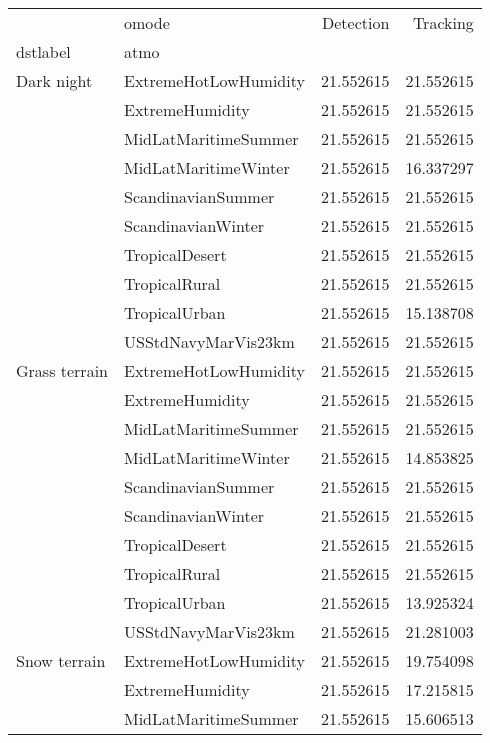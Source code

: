 \begin{tabular}{llrr}
\toprule
             & omode &  Detection &   Tracking \\
dstlabel & atmo &            &            \\
\midrule
Dark night & ExtremeHotLowHumidity &  21.552615 &  21.552615 \\
             & ExtremeHumidity &  21.552615 &  21.552615 \\
             & MidLatMaritimeSummer &  21.552615 &  21.552615 \\
             & MidLatMaritimeWinter &  21.552615 &  16.337297 \\
             & ScandinavianSummer &  21.552615 &  21.552615 \\
             & ScandinavianWinter &  21.552615 &  21.552615 \\
             & TropicalDesert &  21.552615 &  21.552615 \\
             & TropicalRural &  21.552615 &  21.552615 \\
             & TropicalUrban &  21.552615 &  15.138708 \\
             & USStdNavyMarVis23km &  21.552615 &  21.552615 \\
Grass terrain & ExtremeHotLowHumidity &  21.552615 &  21.552615 \\
             & ExtremeHumidity &  21.552615 &  21.552615 \\
             & MidLatMaritimeSummer &  21.552615 &  21.552615 \\
             & MidLatMaritimeWinter &  21.552615 &  14.853825 \\
             & ScandinavianSummer &  21.552615 &  21.552615 \\
             & ScandinavianWinter &  21.552615 &  21.552615 \\
             & TropicalDesert &  21.552615 &  21.552615 \\
             & TropicalRural &  21.552615 &  21.552615 \\
             & TropicalUrban &  21.552615 &  13.925324 \\
             & USStdNavyMarVis23km &  21.552615 &  21.281003 \\
Snow terrain & ExtremeHotLowHumidity &  21.552615 &  19.754098 \\
             & ExtremeHumidity &  21.552615 &  17.215815 \\
             & MidLatMaritimeSummer &  21.552615 &  15.606513 \\

\end{tabular}

